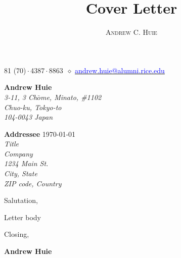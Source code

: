 \documentclass[12pt, a4paper]{article}
\makeatletter
\renewcommand{\maketitle}{
    \begin{center}
        {\Huge\theauthor}

        \vspace{0.25em}

        \raisebox{.3ex}{\footnotesize+}81 (70)\,$\cdot$\,4387\,$\cdot$\,8863~$\diamond$
        \href{mailto:andrew.huie@alumni.rice.edu}{\textcolor{blue}{
            andrew.huie@alumni.rice.edu
        }}

    \end{center}
}
\makeatother
\begin{document}
\title{Cover Letter}
\author{\textsc{Andrew C. Huie}}

\maketitle

\vspace{2em}

\begin{flushright}
    {\color{Gray}
    \textbf{Andrew Huie}\\
    \textsl{
        3-11, 3 Ch$\bar{o}$me, Minato, \#1102\\
        Chuo-ku, Tokyo-to\\
        104-0043 Japan\\
    }}
\end{flushright}

\vspace{1em}

\textbf{Addressee} \hfill \today\\
\textsl{
    Title\\
    Company\\
    1234 Main St.\\
    City, State\\
    ZIP code, Country\\
}

Salutation,

\vspace{0.75em}

Letter body

\vspace{0.75em}

Closing,

\vspace{2em}

\textbf{Andrew Huie}
\end{document}
